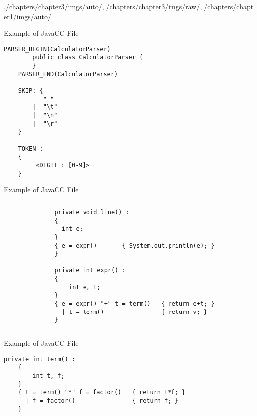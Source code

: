 \begin{graphicspathcontext}{{./chapters/chapter3/imgs/auto/},{./chapters/chapter3/imgs/raw/},{./chapters/chapter1/imgs/auto/}}
\begin{bibunit}[apalike]
\begin{frame}[fragile]{Example of JavaCC File }
	\begin{lstlisting}[style=lststyle-java]
	PARSER_BEGIN(CalculatorParser)
	    public class CalculatorParser {
	    }
	PARSER_END(CalculatorParser)

	SKIP: {
	       " "
	    |  "\t"
	    |  "\n"
	    |  "\r"
	}

	TOKEN :
	{
	     <DIGIT : [0-9]>
	}
	\end{lstlisting}
\end{frame}

\begin{frame}[fragile]{Example of JavaCC File }
	\begin{columns}
		\begin{column}{.35\linewidth}\smaller
\begin{bnf}
	 \\
	 \\
	 \\
	 \\
	 \\
	 \\
\end{bnf}
		\end{column}
		\begin{column}{.65\linewidth}
\begin{lstlisting}[style=lststyle-java]
private void line() :
{
  int e;
}
{ e = expr()       { System.out.println(e); }
}

private int expr() :
{
	int e, t;
}
{ e = expr() "+" t = term()   { return e+t; }
  | t = term()                { return v; }
}
\end{lstlisting}
		\end{column}
	\end{columns}
\end{frame}

\begin{frame}[fragile]{Example of JavaCC File }
	\begin{lstlisting}[style=lststyle-java]
	private int term() :
	{
	    int t, f;
	}
	{ t = term() "*" f = factor()   { return t*f; }
	  | f = factor()                { return f; }
	}


\end{lstlisting}
\end{frame}
\end{bibunit}
\end{graphicspathcontext}
